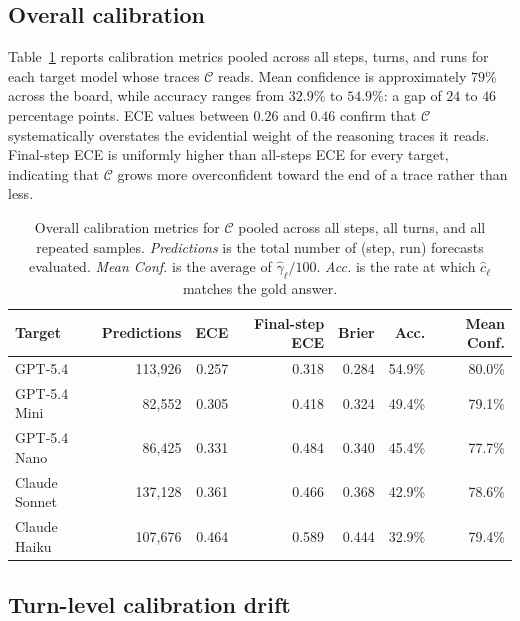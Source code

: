 \subsection{Overall calibration}

Table~\ref{tab:cal_overall} reports calibration metrics pooled across
all steps, turns, and runs for each target model whose traces
$\mathcal{C}$ reads. Mean confidence is approximately $79\%$ across
the board, while accuracy ranges from $32.9\%$ to $54.9\%$: a gap of
$24$ to $46$ percentage points. ECE values between $0.26$ and $0.46$
confirm that $\mathcal{C}$ systematically overstates the evidential
weight of the reasoning traces it reads. Final-step ECE is uniformly
higher than all-steps ECE for every target, indicating that
$\mathcal{C}$ grows more overconfident toward the end of a trace
rather than less.

\begin{table}[t]
\centering
\small
\setlength{\tabcolsep}{6pt}
\renewcommand{\arraystretch}{1.15}
\caption{Overall calibration metrics for $\mathcal{C}$ pooled across
  all steps, all turns, and all repeated samples. \emph{Predictions}
  is the total number of (step, run) forecasts evaluated.
  \emph{Mean Conf.} is the average of $\hat{\gamma}_\ell/100$.
  \emph{Acc.} is the rate at which $\hat{c}_\ell$ matches the
  gold answer.}
\label{tab:cal_overall}
\begin{tabular}{lrrrrrr}
\toprule
\textbf{Target} & \textbf{Predictions} & \textbf{ECE} & \textbf{Final-step ECE} & \textbf{Brier} & \textbf{Acc.} & \textbf{Mean Conf.} \\
\midrule
GPT-5.4         & 113{,}926 & 0.257 & 0.318 & 0.284 & 54.9\% & 80.0\% \\
GPT-5.4 Mini    &  82{,}552 & 0.305 & 0.418 & 0.324 & 49.4\% & 79.1\% \\
GPT-5.4 Nano    &  86{,}425 & 0.331 & 0.484 & 0.340 & 45.4\% & 77.7\% \\
Claude Sonnet   & 137{,}128 & 0.361 & 0.466 & 0.368 & 42.9\% & 78.6\% \\
Claude Haiku    & 107{,}676 & 0.464 & 0.589 & 0.444 & 32.9\% & 79.4\% \\
\bottomrule
\end{tabular}
\end{table}

\subsection{Turn-level calibration drift}

